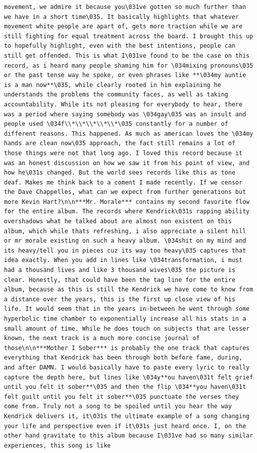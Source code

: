 \documentclass[
  letterpaper,
  DIV=11,
  numbers=noendperiod]{scrreprt}
\begin{document}
\begin{verbatim}
movement, we admire it because you\031ve gotten so much further than we have in a short time\035. It basically highlights that whatever movement white people are apart of, gets more traction while we are still fighting for equal treatment across the board. I brought this up to hopefully highlight, even with the best intentions, people can still get offended. This is what I\031ve found to be the case on this record, as i heard many people shaming him for \034mixing pronouns\035 or the past tense way he spoke, or even phrases like **\034my auntie is a man now**\035, while clearly rooted in him explaining he understands the problems the community faces, as well as taking accountability. While its not pleasing for everybody to hear, there was a period where saying somebody was \034gay\035 was an insult and people used \034f\\*\\*\\*\\*\\*\035 constantly for a number of different reasons. This happened. As much as american loves the \034my hands are clean now\035 approach, the fact still remains a lot of those things were not that long ago. I loved this record because it was an honest discussion on how we saw it from his point of view, and how he\031s changed. But the world sees records like this as tone deaf. Makes me think back to a coment I made recently. If we censor the Dave Chappelles, what can we expect from further generations but more Kevin Hart?\n\n***Mr. Morale*** contains my second favorite flow for the entire album. The records where Kendrick\031s rapping ability overshadows what he talked about are almost non existent on this album, which while thats refreshing, i also appreciate a silent hill or mr morale existing on such a heavy album. \034shit on my mind and its heavy/tell you in pieces cuz its way too heavy\035 captures that idea exactly. When you add in lines like \034transformation, i must had a thousand lives and like 3 thousand wives\035 the picture is clear. Honestly, that could have been the tag line for the entire album, because as this is still the Kendrick we have come to know from a distance over the years, this is the first up close view of his life. It would seem that in the years in-between he went through some hyperbolic time chamber to exponentially increase all his stats in a small amount of time. While he does touch on subjects that are lesser known, the next track is a much more concise journal of those\n\n***Mother I Sober*** is probably the one track that captures everything that Kendrick has been through both before fame, during, and after DAMN. I would basically have to paste every lyric to really capture the depth here, but lines like \034y**ou haven\031t felt grief until you felt it sober**\035 and then the flip \034**you haven\031t felt guilt until you felt it sober**\035 punctuate the verses they come from. Truly not a song to be spoiled until you hear the way Kendrick delivers it, it\031s the ultimate example of a song changing your life and perspective even if it\031s just heard once. I, on the other hand gravitate to this album because I\031ve had so many similar experiences, this song is like 
\end{verbatim}
\end{document}
